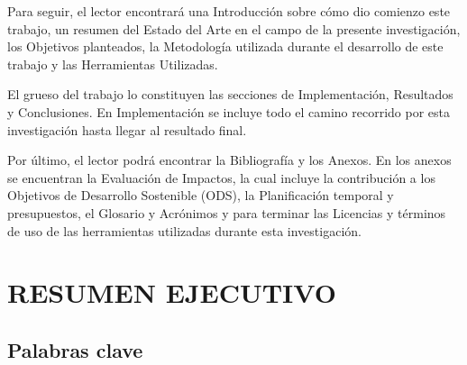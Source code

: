 \documentclass[a4paper, 12pt, spanish, twoside]{article}
\newcommand\blankpage{%
    \null
    \thispagestyle{empty}%
    \newpage}
\begin{document}
Para seguir, el lector encontrará una Introducción sobre cómo dio comienzo este trabajo, un resumen del Estado del Arte en el campo de la presente investigación, los Objetivos planteados, la Metodología utilizada durante el desarrollo de este trabajo y las Herramientas Utilizadas. 

El grueso del trabajo lo constituyen las secciones de Implementación, Resultados y Conclusiones. En Implementación se incluye todo el camino recorrido por esta investigación hasta llegar al resultado final.

Por último, el lector podrá encontrar la Bibliografía y los Anexos. En los anexos se encuentran la Evaluación de Impactos, la cual incluye la contribución a los Objetivos de Desarrollo Sostenible (ODS), la Planificación temporal y presupuestos, el Glosario y Acrónimos y para terminar las Licencias y términos de uso de las herramientas utilizadas durante esta investigación.

\clearpage
\afterpage{\blankpage} %





\newpage
\section*{RESUMEN EJECUTIVO} %



\subsection*{Palabras clave} %
\end{document}

